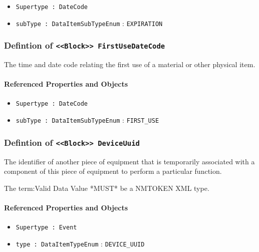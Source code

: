 \begin{itemize}
\item \texttt{Supertype : DateCode}

\item \texttt{subType : DataItemSubTypeEnum} : \texttt{EXPIRATION}

\end{itemize}
\FloatBarrier
\subsubsection{Defintion of \texttt{<<Block>> FirstUseDateCode}}
  \label{type:FirstUseDateCode}

\FloatBarrier

The time and date code relating the first use of a material or other physical item.

\FloatBarrier
\paragraph{Referenced Properties and Objects}

\begin{itemize}
\item \texttt{Supertype : DateCode}

\item \texttt{subType : DataItemSubTypeEnum} : \texttt{FIRST_USE}

\end{itemize}
\FloatBarrier
\subsubsection{Defintion of \texttt{<<Block>> DeviceUuid}}
  \label{type:DeviceUuid}

\FloatBarrier

The identifier of another piece of equipment that is temporarily associated with a component of this piece of equipment to perform a particular function.
  
 The {term:Valid Data Value} *MUST* be a NMTOKEN XML type.

\FloatBarrier
\paragraph{Referenced Properties and Objects}

\begin{itemize}
\item \texttt{Supertype : Event}

\item \texttt{type : DataItemTypeEnum} : \texttt{DEVICE_UUID}

\end{itemize}
\FloatBarrier
